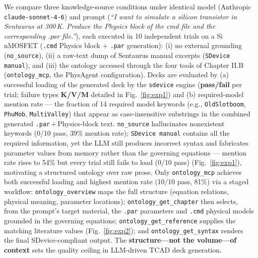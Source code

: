 We compare three knowledge-source conditions under identical model ({\color{red}Anthropic \texttt{claude-sonnet-4-6}}) and prompt ({\color{red}\textit{``I want to simulate a silicon transistor in Sentaurus at 300\,K. Produce the Physics block of the cmd file and the corresponding .par file.''}}), each executed in 10 independent trials on a Si nMOSFET (\texttt{.cmd} Physics block + \texttt{.par} generation): (i) no external grounding (\texttt{no\_source}), (ii) a raw-text dump of Sentaurus manual excerpts ({\color{red}\texttt{SDevice manual}}), and (iii) the ontology accessed through the four tools of {\color{red}Chapter II.B} (\texttt{ontology\_mcp}, the PhysAgent configuration). Decks are evaluated by (a) {\color{red}successful loading of the generated deck by the \texttt{sdevice} engine (\textbf{pass/fail} per trial; failure types \textbf{K/V/M} detailed in Fig.~\ref{fig:exp1})} and (b) {\color{red}required-model mention rate --- the fraction of 14 required model keywords (e.g., \texttt{OldSlotboom}, \texttt{PhuMob}, \texttt{MultiValley}) that appear as case-insensitive substrings in the combined generated \texttt{.par}\,+\,Physics-block text}. \texttt{no\_source} hallucinates nonexistent keywords (0/10 pass, 39\% {\color{red}mention rate}); {\color{red}\texttt{SDevice manual}} {\color{red}contains all the required information, yet the LLM still produces incorrect syntax and fabricates parameter values from memory rather than the governing equations} --- {\color{red}mention rate rises to 54\%} but {\color{red}every trial still fails to load (0/10 pass)} (Fig.~\ref{fig:exp1}){\color{red}, motivating a structured ontology over raw prose}. Only \texttt{ontology\_mcp} achieves both {\color{red}successful loading} and highest {\color{red}mention rate} ({\color{red}10/10 pass}, 81\%) {\color{red}via a staged workflow: \texttt{ontology\_overview} maps the full structure (equation relations, physical meaning, parameter locations); \texttt{ontology\_get\_chapter} then selects, from the prompt's target material, the \texttt{.par} parameters and \texttt{.cmd} physical models grounded in the governing equations; \texttt{ontology\_get\_reference} supplies the matching literature values (Fig.~\ref{fig:exp2}); and \texttt{ontology\_get\_syntax} renders the final SDevice-compliant output}. The \textbf{structure---not the volume---of context} sets the quality ceiling in LLM-driven TCAD deck generation.
